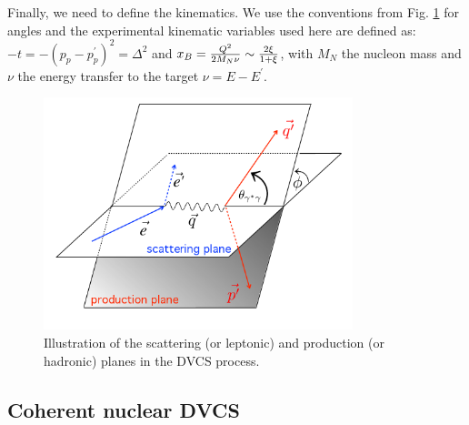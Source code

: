 \documentclass[aps,prc,preprint,superscriptaddress]{revtex4}
\begin{document}
Finally, we need to define the kinematics. We use the 
conventions from Fig. \ref{fig:PhiAngle} for angles and the experimental kinematic variables
used here are defined as: 
$-t = -(p_p-p_p^\prime)^2 = \Delta^2$ and 
$x_B = {Q^2 \over 2 M_N \nu}\sim {2\xi \over 1+\xi}$, with $M_N$ the nucleon mass and $\nu$ the
energy transfer to the target $\nu = {E -E^\prime} $. 

\begin{figure}[tbp!]
\center
\includegraphics[width=9cm]{fig1/finalplane.png}
	\caption{Illustration of the scattering (or leptonic) and production (or hadronic) planes
	in the DVCS process.} 
\label{fig:PhiAngle}
\end{figure}



\subsection{Coherent nuclear DVCS}
\end{document}
